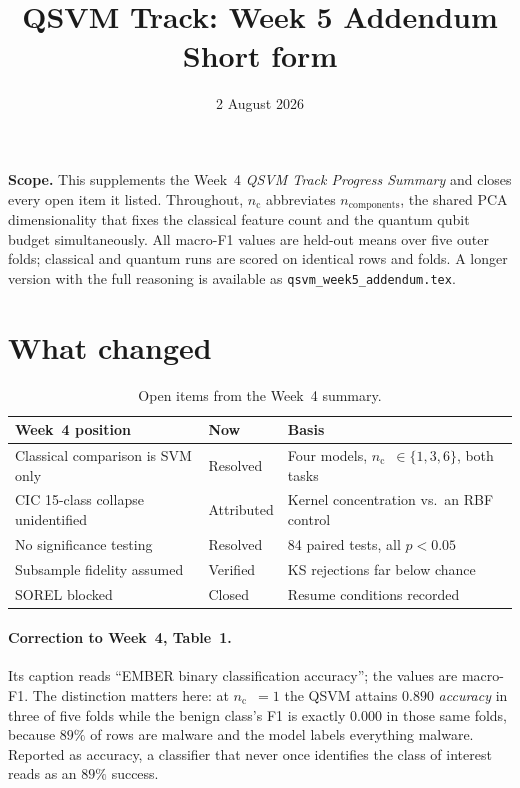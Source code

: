 \documentclass[10pt]{article}
\title{\vspace{-2.2em}QSVM Track: Week 5 Addendum\\[0.2em]
\large Short form}
\date{2 August 2026}
\newcommand{\nc}{\ensuremath{n_{\mathrm{c}}}}
\begin{document}
\maketitle
\vspace{-1.8em}

\noindent
\textbf{Scope.} This supplements the Week~4 \emph{QSVM Track Progress Summary}
and closes every open item it listed. Throughout, \nc{} abbreviates
$n_{\mathrm{components}}$, the shared PCA dimensionality that fixes the classical
feature count and the quantum qubit budget simultaneously. All macro-F1 values
are held-out means over five outer folds; classical and quantum runs are scored
on identical rows and folds. A longer version with the full reasoning is
available as \texttt{qsvm\_week5\_addendum.tex}.

\section{What changed}

\begin{table}[htbp]
\centering
\small
\caption{Open items from the Week~4 summary.}
\begin{tabular}{@{}p{}p{}p{}@{}}
\toprule
\textbf{Week~4 position} & \textbf{Now} & \textbf{Basis} \\
\midrule
Classical comparison is SVM only & Resolved & Four models, \nc{}~$\in\{1,3,6\}$, both tasks \\
CIC 15-class collapse unidentified & Attributed & Kernel concentration vs.\ an RBF control \\
No significance testing & Resolved & 84 paired tests, all $p<0.05$ \\
Subsample fidelity assumed & Verified & KS rejections far below chance \\
SOREL blocked & Closed & Resume conditions recorded \\
\bottomrule
\end{tabular}
\end{table}

\vspace{-0.6em}
\paragraph{Correction to Week~4, Table~1.} Its caption reads ``EMBER binary
classification accuracy''; the values are macro-F1. The distinction matters
here: at \nc{}~$=1$ the QSVM attains $0.890$ \emph{accuracy} in three of five
folds while the benign class's F1 is exactly $0.000$ in those same folds,
because $89\%$ of rows are malware and the model labels everything malware.
Reported as accuracy, a classifier that never once identifies the class of
interest reads as an $89\%$ success.
\end{document}
